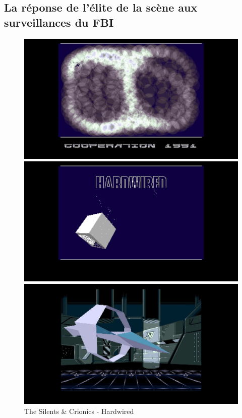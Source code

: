 \subsection*{La réponse de l'élite de la scène aux surveillances du FBI}
\begin{figure}[h]
  \begin{minipage}[b]{0.30\linewidth}
    \centering
    \includegraphics[width=\linewidth]{images/demoscene/demos/crio1.png}
  \end{minipage}
  \hfill
  \begin{minipage}[b]{0.30\linewidth}
    \centering
    \includegraphics[width=\linewidth]{images/demoscene/demos/crio2.png}
  \end{minipage}
  \hfill
  \begin{minipage}[b]{0.30\linewidth}
    \centering
    \includegraphics[width=\linewidth]{images/demoscene/demos/crio3.png}
  \end{minipage}
  \caption{The Silents \& Crionics - Hardwired}
  \label{crio}
\end{figure}


